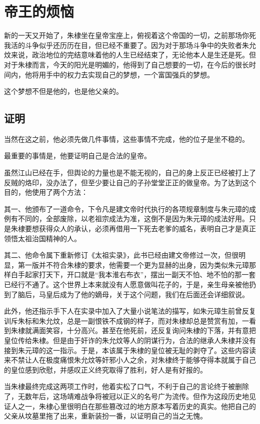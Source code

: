 \section{帝王的烦恼}
\ifnum{}
	\begin{multicols}{\theparacolNo}
\fi

新的一天又开始了，朱棣坐在皇帝宝座上，俯视着这个帝国的一切，之前那场你死我活的斗争似乎还历历在目，但已经不重要了。因为对于那场斗争中的失败者朱允炆来说，政治地位的完结意味着他的人生已经结束了，无论他本人是生还是死。但对于朱棣而言，今天的阳光是明媚的，他得到了自己想要的一切，在今后的很长时间内，他将用手中的权力去实现自己的梦想，一个富国强兵的梦想。

这个梦想不但是他的，也是他父亲的。

\subsection{证明}
当然在这之前，他必须先做几件事情，这些事情不完成，他的位子是坐不稳的。

最重要的事情是，他要证明自己是合法的皇帝。

虽然江山已经在手，但舆论的力量也是不能无视的，自己的身上反正已经被打上了反贼的烙印，没办法了，但至少要让自己的子孙堂堂正正的做皇帝。为了达到这个目的，他使用了两个方法：

其一、他颁布了一道命令，下令凡是建文帝时代执行的各项规章制度与朱元璋的成例有不同的，全部废除，以老祖宗成法为准，这倒不是因为朱元璋的成法好用。只是朱棣要想获得众人的承认，必须再借用一下死去老爹的威名，表明自己才是真正领悟太祖治国精神的人。

其二、他命令属下重新修订《太祖实录》，此书已经由建文帝修过一次，但很明显，第一版并不符合朱棣的要求，他需要一个更为显赫的出身，因为类似朱元璋那样白手起家打天下，开口就是“我本淮右布衣”，摆出一副天不怕、地不怕的那一套已经行不通了。这个世界上本来就没有人愿意做叫花子的，于是，亲生母亲被他扔到了脑后，马皇后成为了他的嫡母，关于这个问题，我们在后面还会详细叙说。

此外，他还指示手下人在实录中加入了大量小说笔法的描写，如朱元璋生前曾反复训斥朱标和朱允炆，总是一副恨铁不成钢的样子，而对朱棣却总是赞赏有加，一看到朱棣就满面笑容，十分高兴。甚至在他死前，还反复询问朱棣的下落，并有意把皇位传给朱棣。但是由于奸诈的朱允炆等人的阴谋行为，合法的继承人朱棣并没有接到朱元璋的这一指示。于是，本该属于朱棣的皇位被无耻的剥夺了。这些内容读来不禁让人在极度痛恨朱允炆等奸邪小人之余，对朱棣终于能够夺得本就属于自己的皇位感到欣慰，并感叹正义终究取得了胜利，好人是有好报的。

当朱棣最终完成这两项工作时，他着实松了口气，不利于自己的言论终于被删除了，无数年后，这场靖难战争将被冠以正义的名号广为流传。但作为这段历史地见证人之一，朱棣心里很明白在那些篡改过的地方原本写着历史的真实。他把自己的父亲从坟墓里拖了出来，重新装扮一番，以证明自己的当之无愧。


\end{multicols}
